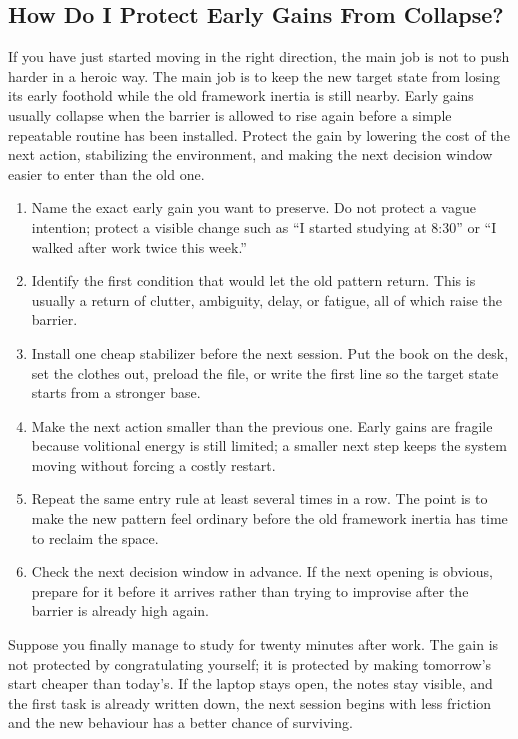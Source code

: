 \subsection{How Do I Protect Early Gains From Collapse?}

If you have just started moving in the right direction, the main job is not to
push harder in a heroic way. The main job is to keep the new target state from
losing its early foothold while the old framework inertia is still nearby.
Early gains usually collapse when the barrier is allowed to rise again before a
simple repeatable routine has been installed. Protect the gain by lowering the
cost of the next action, stabilizing the environment, and making the next
decision window easier to enter than the old one.

\begin{enumerate}[nosep]
  \item Name the exact early gain you want to preserve. Do not protect a vague
        intention; protect a visible change such as ``I started studying at
        8:30'' or ``I walked after work twice this week.''
  \item Identify the first condition that would let the old pattern return.
        This is usually a return of clutter, ambiguity, delay, or fatigue, all
        of which raise the barrier.
  \item Install one cheap stabilizer before the next session. Put the book on
        the desk, set the clothes out, preload the file, or write the first
        line so the target state starts from a stronger base.
  \item Make the next action smaller than the previous one. Early gains are
        fragile because volitional energy is still limited; a smaller next step
        keeps the system moving without forcing a costly restart.
  \item Repeat the same entry rule at least several times in a row. The point
        is to make the new pattern feel ordinary before the old framework
        inertia has time to reclaim the space.
  \item Check the next decision window in advance. If the next opening is
        obvious, prepare for it before it arrives rather than trying to
        improvise after the barrier is already high again.
\end{enumerate}

\begin{remark}
Suppose you finally manage to study for twenty minutes after work. The gain is
not protected by congratulating yourself; it is protected by making tomorrow's
start cheaper than today's. If the laptop stays open, the notes stay visible,
and the first task is already written down, the next session begins with less
friction and the new behaviour has a better chance of surviving.
\end{remark}
